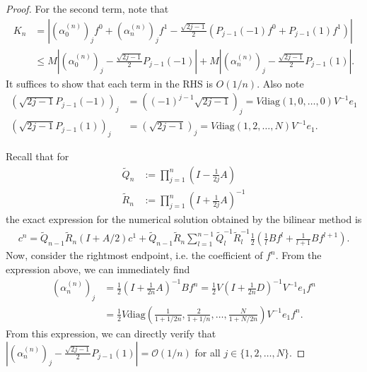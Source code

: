 \documentclass{article}
\theoremstyle{definition}
\newcommand{\pr}[1]{ \left( #1 \right) }
\newcommand{\abs}[1]{\left| #1 \right|}
\begin{document}
\begin{proof}

For the second term, note that
\begin{align*}
    K_n &= \left| \pr{\alpha^{(n)}_0}_j f^0 + \pr{\alpha^{(n)}_n}_j f^1 - \frac{\sqrt{2j-1}}{2}\pr{P_{j-1}(-1)f^0 + P_{j-1}(1)f^1} \right| \\
    &\leq M \left| \pr{\alpha^{(n)}_0}_j - \frac{\sqrt{2j-1}}{2} P_{j-1}(-1) \right| 
    + M \left| \pr{\alpha^{(n)}_n}_j - \frac{\sqrt{2j-1}}{2} P_{j-1}(1)\right|.
\end{align*}
It suffices to show that each term in the RHS is $O(1/n)$. Also note
\begin{align*}
    \pr{\sqrt{2j-1}P_{j-1}(-1)}_j &= \pr{(-1)^{j-1} \sqrt{2j-1}}_j 
    = V \text{diag} \pr{1, 0, \dots, 0} V^{-1} e_1 \\
    \pr{\sqrt{2j-1}P_{j-1}(1)}_j
    &= \pr{\sqrt{2j-1}}_j
    = V \text{diag} \pr{1, 2, \dots, N} V^{-1} e_1.
\end{align*}

Recall that for
\begin{align*}
        \tilde{Q}_n &:= \prod_{j=1}^n \pr{I - \frac{1}{2j}A}\\
        \tilde{R}_n &:= \prod_{j=1}^n \pr{I + \frac{1}{2j}A}^{-1}
    \end{align*}
the exact expression for the numerical solution obtained by the bilinear method is
\begin{align*}
    c^n = 
    \tilde{Q}_{n-1} \tilde{R}_{n} \pr{I+A/2} c^1 + 
    \tilde{Q}_{n-1} \tilde{R}_{n} \sum_{l=1}^{n-1} \tilde{Q}_l^{-1} \tilde{R}_l^{-1}  \frac{1}{2}\pr{\frac{1}{l}Bf^l + \frac{1}{l+1}Bf^{l+1}}.
\end{align*}
Now, consider the rightmost endpoint, i.e. the coefficient of $f^n$.
From the expression above, we can immediately find
\begin{align*}
    \pr{\alpha_n^{(n)}}_j
    &= \frac{1}{2} \pr{I+\frac{1}{2n}A}^{-1} B f^n 
    = \frac{1}{2} V \pr{I + \frac{1}{2n}D}^{-1}  V^{-1}e_1 f^n \\
    &= \frac{1}{2} V \text{diag}
    \pr{\frac{1}{1+1/2n}, \frac{2}{1+1/n}, \dots, \frac{N}{1+N/2n}}
    V^{-1}e_1 f^n.
\end{align*}
From this expression, we can directly verify that $\abs{ \pr{\alpha_n^{(n)}}_j -  \frac{\sqrt{2j-1}}{2}P_{j-1}(1)} = \mathcal{O}(1/n)$ for all $j \in \{1,2, \dots, N\}$. 


\end{proof}
\end{document}
